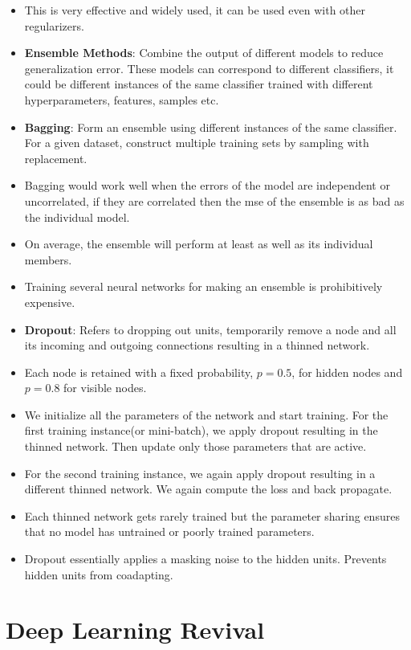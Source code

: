 \documentclass[a4paper]{article}
\begin{document}
\begin{itemize}
    \item This is very effective and widely used, it can be used even with other regularizers.
    \item \textbf{Ensemble Methods}: Combine the output of different models to reduce generalization error. These models can correspond to different classifiers, it could be different instances of the same classifier trained with different hyperparameters, features, samples etc.
    \item \textbf{Bagging}: Form an ensemble using different instances of the same classifier. For a given dataset, construct multiple training sets by sampling with replacement.
    \item Bagging would work well when the errors of the model are independent or uncorrelated, if they are correlated then the mse of the ensemble is as bad as the individual model.
    \item On average, the ensemble will perform at least as well as its individual members.
    \item Training several neural networks for making an ensemble is prohibitively expensive.
    \item \textbf{Dropout}: Refers to dropping out units, temporarily remove a node and all its incoming and outgoing connections resulting in a thinned network.
    \item Each node is retained with a fixed probability, $p=0.5$, for hidden nodes and $p=0.8$ for visible nodes.
    \item We initialize all the parameters of the network and start training. For the first training instance(or mini-batch), we apply dropout resulting in the thinned network. Then update only those parameters that are active.
    \item For the second training instance, we again apply dropout resulting in a different thinned network. We again compute the loss and back propagate.
    \item Each thinned network gets rarely trained but the parameter sharing ensures that no model has untrained or poorly trained parameters.
    \item Dropout essentially applies a masking noise to the hidden units. Prevents hidden units from coadapting.
\end{itemize}

\section{Deep Learning Revival}
\end{document}
